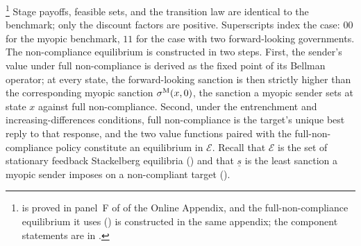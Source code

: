 \footnote{
is proved in panel~F of  of the Online Appendix, and the
full-non-compliance equilibrium it uses () is constructed in
the same appendix; the component statements are in
.} Stage
payoffs, feasible sets, and the transition law are identical to the benchmark; only
the discount factors are positive. Superscripts index the case: $00$ for the myopic
benchmark, $11$ for the case with two forward-looking governments. The non-compliance
equilibrium is constructed in two steps. First, the sender's value under full
non-compliance is derived as the fixed point of its Bellman operator; at every state,
the forward-looking sanction is then strictly higher than the corresponding myopic
sanction $\sigma^{\mathrm{M}}(x,0)$, the sanction a myopic sender sets at state $x$ against full
non-compliance. Second, under the entrenchment and increasing-differences
conditions, full non-compliance is the target's unique best reply to that response, and
the two value functions paired with the full-non-compliance policy constitute an
equilibrium in $\mathcal E$. Recall that $\mathcal E$ is the set of stationary feedback
Stackelberg equilibria () and that $\underline s$ is the least
sanction a myopic sender imposes on a non-compliant target ().

